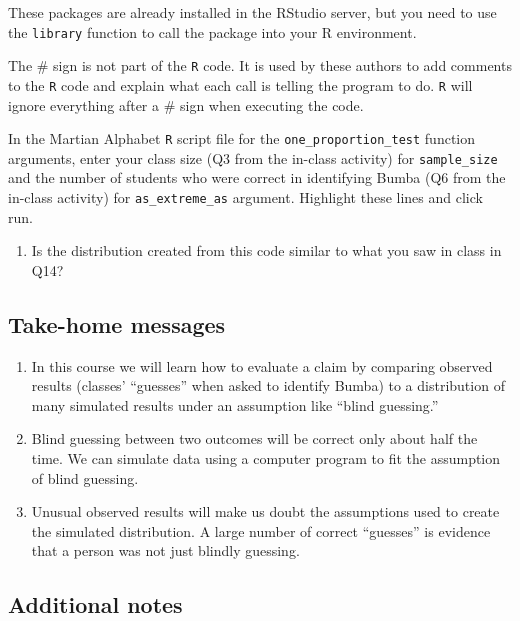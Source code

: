 \documentclass[
]{report}
\providecommand{\tightlist}{%
  \setlength{\itemsep}{0pt}\setlength{\parskip}{0pt}}
\begin{document}
These packages are already installed in the RStudio server, but you need to use the \texttt{library} function to call the package into your R environment.

The \# sign is not part of the \texttt{R} code.
It is used by these authors to add comments to the \texttt{R} code and explain what each call is telling the program to do.
\texttt{R} will ignore everything after a \# sign when executing the code.

In the Martian Alphabet \texttt{R} script file for the \texttt{one\_proportion\_test} function arguments, enter your class size (Q3 from the in-class activity) for \texttt{sample\_size} and the number of students who were correct in identifying Bumba (Q6 from the in-class activity) for \texttt{as\_extreme\_as} argument. Highlight these lines and click run.

\begin{enumerate}
\def\labelenumi{\arabic{enumi}.}
\setcounter{enumi}{3}
\tightlist
\item
  Is the distribution created from this code similar to what you saw in class in Q14?
\end{enumerate}

\vspace{0.3in}

\hypertarget{take-home-messages}{%
\subsection{Take-home messages}\label{take-home-messages}}

\begin{enumerate}
\def\labelenumi{\arabic{enumi}.}
\item
  In this course we will learn how to evaluate a claim by comparing observed results (classes' ``guesses'' when asked to identify Bumba) to a distribution of many simulated results under an assumption like ``blind guessing.''
\item
  Blind guessing between two outcomes will be correct only about half the time. We can simulate data using a computer program to fit the assumption of blind guessing.
\item
  Unusual observed results will make us doubt the assumptions used to create the simulated distribution. A large number of correct ``guesses'' is evidence that a person was not just blindly guessing.
\end{enumerate}

\hypertarget{additional-notes}{%
\subsection{Additional notes}\label{additional-notes}}
\end{document}
